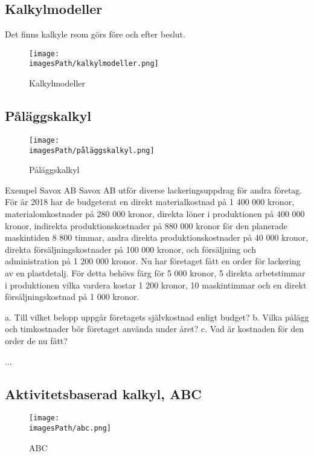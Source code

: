 \subsection{Kalkylmodeller}
Det finns kalkyle rsom görs före och efter beslut.
\begin{figure}[!h]
    \centering
    \texttt{[image: \\imagesPath/kalkylmodeller.png]}
    \caption{Kalkylmodeller}
\end{figure}


\newpage
\subsection{Påläggskalkyl}
\begin{figure}[!h]
    \centering
    \texttt{[image: \\imagesPath/påläggskalkyl.png]}
    \caption{Påläggskalkyl}
\end{figure}

\begin{exampleblock}{Exempel Savox AB}
   Savox AB utför diverse lackeringsuppdrag för andra företag. För år 2018 har de 
   budgeterat en direkt materialkostnad på 1 400 000 kronor, materialomkostnader på 
   280 000 kronor, direkta löner i produktionen på 400 000 kronor, indirekta produktionskostnader 
   på 880 000 kronor för den planerade maskintiden 8 800 timmar, andra direkta 
   produktionskostnader på 40 000 kronor, direkta försäljningskostnader på 100 000 kronor, 
   och försäljning och administration på 1 200 000 kronor. Nu har företaget fått en order för 
   lackering av en plastdetalj. För detta behövs färg för 5 000 kronor, 5 direkta 
   arbetstimmar i produktionen vilka vardera kostar 1 200 kronor, 10 maskintimmar och en 
   direkt försäljningskostnad på 1 000 kronor. 

   a. Till vilket belopp uppgår företagets självkostnad enligt budget?
   b. Vilka pålägg och timkostnader bör företaget använda under året? 
   c. Vad är kostnaden för den order de nu fått? 

   ... %
\end{exampleblock}

%
%
%

\newpage
\subsection{Aktivitetsbaserad kalkyl, ABC}
\begin{figure}[!h]
    \centering
    \texttt{[image: \\imagesPath/abc.png]}
    \caption{ABC}
\end{figure}

